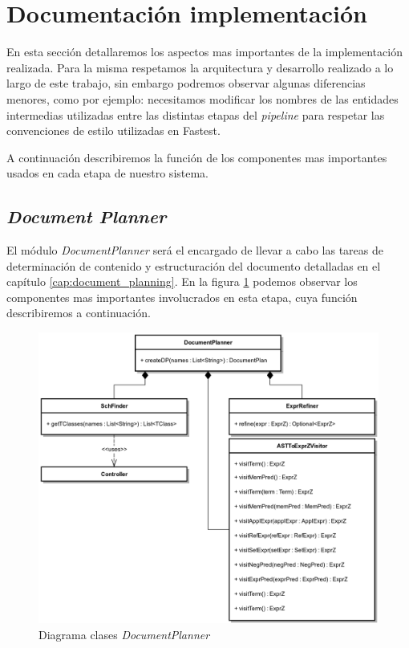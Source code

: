 \section{Documentación implementación}

En esta sección detallaremos los aspectos mas importantes de la implementación realizada. Para la misma respetamos la arquitectura y desarrollo realizado a lo largo de este trabajo, sin embargo podremos observar algunas diferencias menores, como por ejemplo: necesitamos modificar los nombres de las entidades intermedias utilizadas entre las distintas etapas del \textit{pipeline} para respetar las convenciones de estilo utilizadas en Fastest.

A continuación describiremos la función de los componentes mas importantes usados en cada etapa de nuestro sistema.

\subsection{\textit{Document Planner}}

El módulo \emph{DocumentPlanner} será el encargado de llevar a cabo las tareas de determinación de contenido y estructuración del documento detalladas en el capítulo \ref{cap:document_planning}. En la figura \ref{fig:imp_documentplanner} podemos observar los componentes mas importantes involucrados en esta etapa, cuya función describiremos a continuación. 

\begin{figure}[H]
  	\centering
	\includegraphics[scale=0.25]{img/documentplanner_imp.png}
	\caption{Diagrama clases \textit{DocumentPlanner}}
  	\label{fig:imp_documentplanner}
\end{figure}

